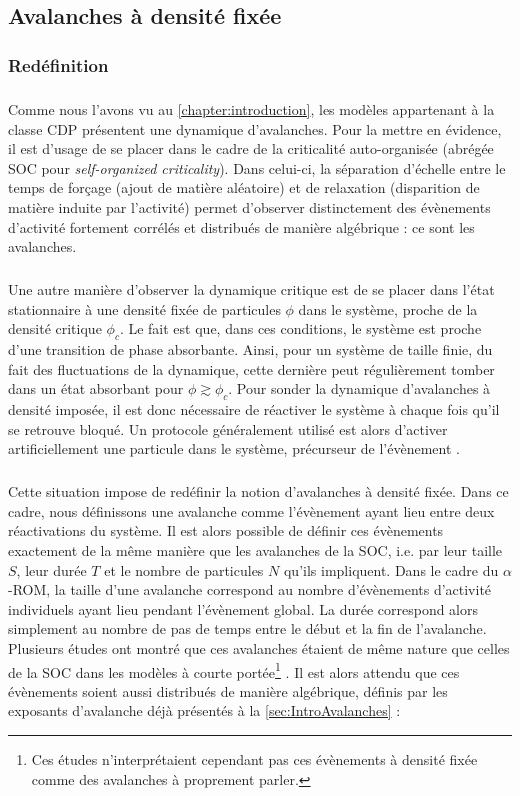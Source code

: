 \label{sec:AvSusp}

\subsection{Avalanches à densité fixée}

\subsubsection{Redéfinition}

\subparagraph{}Comme nous l'avons vu au \autoref{chapter:introduction}, les modèles appartenant à la classe CDP présentent une dynamique d'avalanches. Pour la mettre en évidence, il est d'usage de se placer dans le cadre de la criticalité auto-organisée (abrégée SOC pour \textit{self-organized criticality}). Dans celui-ci, la séparation d'échelle entre le temps de forçage (ajout de matière aléatoire) et de relaxation (disparition de matière induite par l'activité) permet d'observer distinctement des évènements d'activité fortement corrélés et distribués de manière algébrique : ce sont les avalanches.

\subparagraph{}Une autre manière d'observer la dynamique critique est de se placer dans l'état stationnaire à une densité fixée de particules $\phi$ dans le système, proche de la densité critique $\phi_c$. Le fait est que, dans ces conditions, le système est proche d'une transition de phase absorbante. Ainsi, pour un système de taille finie, du fait des fluctuations de la dynamique, cette dernière peut régulièrement tomber dans un état absorbant pour $\phi \gtrsim \phi_c$. Pour sonder la dynamique d'avalanches à densité imposée, il est donc nécessaire de réactiver le système à chaque fois qu'il se retrouve bloqué. Un protocole généralement utilisé est alors d'activer artificiellement une particule dans le système, précurseur de l'évènement \cite{lubeck_universal_2003, vespignani_absorbing_state_2000, munoz_avalanche_1999}.

\subparagraph{}Cette situation impose de redéfinir la notion d'avalanches à densité fixée. Dans ce cadre, nous définissons une avalanche comme l'évènement ayant lieu entre deux réactivations du système. Il est alors possible de définir ces évènements exactement de la même manière que les avalanches de la SOC, i.e. par leur taille $S$, leur durée $T$ et le nombre de particules $N$ qu'ils impliquent. Dans le cadre du $\alpha$-ROM, la taille d'une avalanche correspond au nombre d'évènements d'activité individuels ayant lieu pendant l'évènement global. La durée correspond alors simplement au nombre de pas de temps entre le début et la fin de l'avalanche. Plusieurs études ont montré que ces avalanches étaient de même nature que celles de la SOC dans les modèles à courte portée\footnote{Ces études n'interprétaient cependant pas ces évènements à densité fixée comme des avalanches à proprement parler.} \cite{lubeck_universal_2003, vespignani_absorbing_state_2000, munoz_avalanche_1999}. Il est alors attendu que ces évènements soient aussi distribués de manière algébrique, définis par les exposants d'avalanche déjà présentés à la \autoref{sec:IntroAvalanches} :

